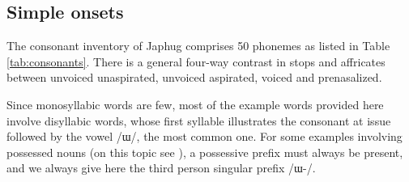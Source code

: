 \documentclass[oneside,a4paper,11pt]{article}
\newcommand{\ipa}[1]{\mbox{\phon/#1/}}
\begin{document}
 \subsection{Simple onsets} \label{sec:simple}

 The consonant inventory of Japhug comprises 50 phonemes as listed in Table \ref{tab:consonants}. There is a general four-way contrast in stops and affricates between unvoiced unaspirated, unvoiced aspirated, voiced and prenasalized.
 
Since monosyllabic words are few,  most of the example words provided here involve disyllabic words, whose first syllable illustrates the consonant at issue followed by the vowel \ipa{ɯ}, the most common one. For some examples involving possessed nouns (on this topic see \citealt[6]{jacques14antipassive}), a possessive prefix must always be present, and we always give here the third person singular prefix  \ipa{ɯ-}.
 
\end{document}
